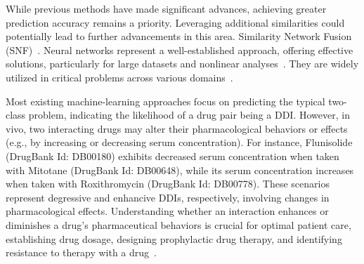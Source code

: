\documentclass[unnumsec,webpdf,contemporary,large]{oup-authoring-template}%
\theoremstyle{thmstyleone}%
\theoremstyle{thmstyletwo}%
\theoremstyle{thmstylethree}%
\begin{document}
While previous methods have made significant advances, achieving greater prediction accuracy remains a priority. Leveraging additional similarities could potentially lead to further advancements in this area. Similarity Network Fusion (SNF)~\cite{Olayan2018, Tian2017, Kim2016}. Neural networks represent a well-established approach, offering effective solutions, particularly for large datasets and nonlinear analyses~\cite{Wang2016}. They are widely utilized in critical problems across various domains~\cite{HUANG2009, Fu2017, Pan2016}.

Most existing machine-learning approaches focus on predicting the typical two-class problem, indicating the likelihood of a drug pair being a DDI. However, in vivo, two interacting drugs may alter their pharmacological behaviors or effects (e.g., by increasing or decreasing serum concentration). For instance, Flunisolide (DrugBank Id: DB00180) exhibits decreased serum concentration when taken with Mitotane (DrugBank Id: DB00648), while its serum concentration increases when taken with Roxithromycin (DrugBank Id: DB00778). These scenarios represent degressive and enhancive DDIs, respectively, involving changes in pharmacological effects. Understanding whether an interaction enhances or diminishes a drug's pharmaceutical behaviors is crucial for optimal patient care, establishing drug dosage, designing prophylactic drug therapy, and identifying resistance to therapy with a drug~\cite{jan1981}.
\end{document}
